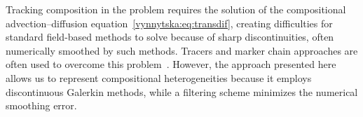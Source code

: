 Tracking composition in the problem requires the solution of the
compositional advection--diffusion
equation~\eqref{vynnytska:eq:transdif}, creating difficulties for
standard field-based methods to solve because of sharp
discontinuities, often numerically smoothed by such methods.  Tracers
and marker chain approaches are often used to overcome this
problem~\citep{IsmailZadehTackley2010}. However, the approach
presented here allows us to represent compositional heterogeneities
because it employs discontinuous Galerkin methods, while a filtering
scheme minimizes the numerical smoothing error.%

\egroup



